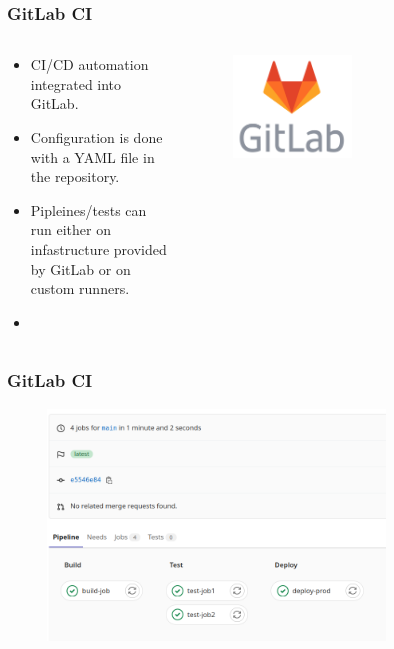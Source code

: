 \documentclass[aspectratio=169]{beamer}
\begin{document}
\begin{frame}
	\frametitle{GitLab CI}
	
	\begin{columns}
\begin{column}{0.6\textwidth}
	\begin{block}{}
		\begin{itemize}
			\item CI/CD automation integrated into GitLab.
			\item Configuration is done with a YAML file in the repository.
			\item Pipleines/tests can run either on infastructure provided by GitLab or on custom runners.
			\item {}
		\end{itemize}
	\end{block}
\end{column}
\begin{column}{0.4\textwidth}
	\begin{figure}[ht!]
	\begin{center}
  	  \includegraphics[width=0.5\textwidth]{img/gitlab-logo.png}
	\end{center}
	\end{figure}
\end{column}
\end{columns}

\end{frame}

\begin{frame}
	\frametitle{GitLab CI}
	\begin{figure}[ht!]
	\begin{center}
  	  \includegraphics[width=0.8\textwidth]{img/gitlab-ci-1.png}
	\end{center}
	\end{figure}
\end{frame}
\end{document}
